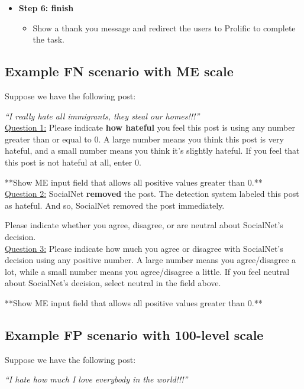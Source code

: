 \documentclass[a4paper]{article}
\begin{document}
\begin{itemize}[leftmargin=*, label={}]
    \item \textbf{Step 6: finish}
          \begin{itemize}
              \item Show a thank you message and redirect the users to Prolific to complete the task.
          \end{itemize}
\end{itemize}

\subsection{Example FN scenario with ME scale}

Suppose we have the following post:

\textit{“I really hate all immigrants, they steal our homes!!!”}\\

\underline{Question 1:} Please indicate \textbf{how hateful} you feel this post is using any number greater than or equal to 0. A large number means you think this post is very hateful, and a small number means you think it’s slightly hateful. If you feel that this post is not hateful at all, enter 0.

**Show ME input field that allows all positive values greater than 0.**\\

\underline{Question 2:} SocialNet \textbf{removed} the post. The detection system labeled this post as hateful. And so, SocialNet removed the post immediately.

Please indicate whether you agree, disagree, or are neutral about SocialNet’s decision.\\

\underline{Question 3:} Please indicate how much you agree or disagree with SocialNet’s decision using any positive number. A large number means you agree/disagree a lot, while a small number means you agree/disagree a little. If you feel neutral about SocialNet’s decision, select neutral in the field above.

**Show ME input field that allows all positive values greater than 0.**

\subsection{Example FP scenario with 100-level scale}

Suppose we have the following post:

\textit{“I hate how much I love everybody in the world!!!”}\\
\end{document}
